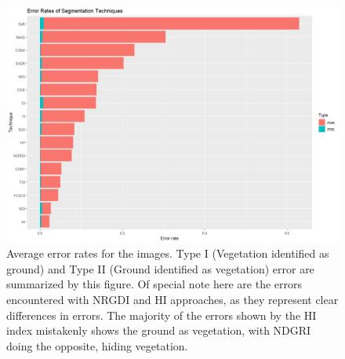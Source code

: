 \documentclass[letterpaper]{article}
\begin{document}
{%
\begin{figure}[h]
	\centering
	\includegraphics[width=.75\linewidth]{figures/segmentation-error-rates.png}
	\caption[Error rates of segmentation algorithms]{Average error rates for the images. Type I (Vegetation identified as ground) and Type II (Ground identified as vegetation) error are summarized by this figure. Of special note here are the errors encountered with NRGDI and HI approaches, as they represent clear differences in errors. The majority of the errors shown by the HI index mistakenly shows the ground as vegetation, with NDGRI  doing the opposite, hiding vegetation.}
	\label{fig:segmentation-errors}
\end{figure}

}
\end{document}
